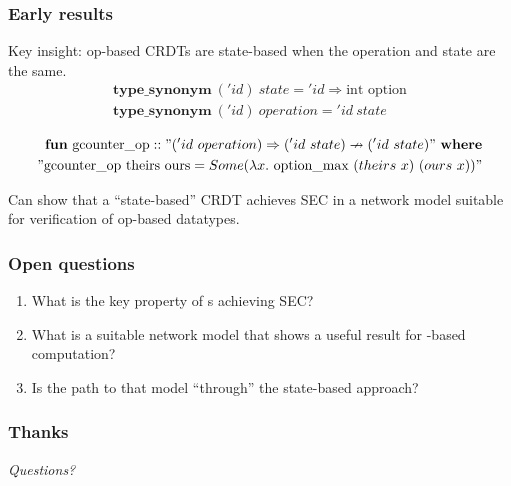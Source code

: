 \documentclass[aspectratio=169,compress]{beamer}
\newcommand{\dcrdt}{\text{$\delta$-CRDT}}
\begin{document}
  \begin{frame}
    \frametitle{Early results}

    Key insight: op-based CRDTs are state-based when the operation and state are
    the same.
    \[
      \begin{aligned}
        \textbf{type\_synonym}~('id)~state = {'id} \Rightarrow \text{int option} \\
        \textbf{type\_synonym}~('id)~operation = {'id}~state \\
      \end{aligned}
    \]
    \[
      \begin{aligned}
      \textbf{fun}~\text{gcounter\_op} :: "({'id}~operation) \Rightarrow ({'id}~state) \nrightarrow ({'id}~state)"~\textbf{where} \\
      "\text{gcounter\_op theirs ours} = Some (\lambda x.~\text{option\_max}~(theirs~x)~(ours~x))"
      \end{aligned}
    \]

    Can show that a ``state-based'' CRDT achieves SEC in a network model
    suitable for verification of op-based datatypes.
  \end{frame}

  \begin{frame}
    \frametitle{Open questions}

    \begin{enumerate}
      \item What is the key property of {\dcrdt}s achieving SEC?
      \item What is a suitable network model that shows a useful result for
        \dcrdt-based computation?
      \item Is the path to that model ``through'' the state-based approach?
    \end{enumerate}
  \end{frame}

  \begin{frame}
    \frametitle{Thanks}
    \begin{center}
      \LARGE\it
      Questions?
    \end{center}
  \end{frame}
\end{document}

